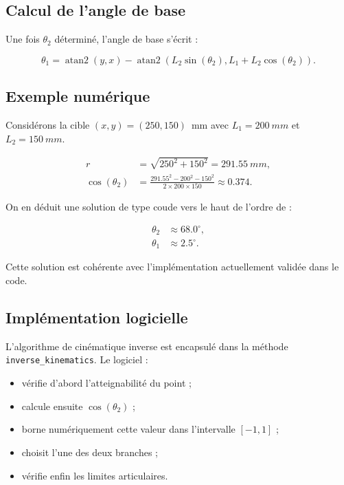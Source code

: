 \documentclass[12pt,a4paper]{report}
\newcommand{\Lone}{L_1}
\newcommand{\Ltwo}{L_2}
\newcommand{\thone}{\theta_1}
\newcommand{\thtwo}{\theta_2}
\begin{document}
\subsection{Calcul de l'angle de base}

Une fois $\thtwo$ déterminé, l'angle de base s'écrit :

\begin{equation}
    \thone = \operatorname{atan2}(y,x)
    - \operatorname{atan2}\left(\Ltwo \sin(\thtwo), \Lone + \Ltwo \cos(\thtwo)\right).
\end{equation}

\subsection{Exemple numérique}

Considérons la cible $(x,y) = (250,150)$~mm avec $\Lone=\SI{200}{mm}$ et
$\Ltwo=\SI{150}{mm}$.

\begin{align}
    r &= \sqrt{250^2 + 150^2} = \SI{291.55}{mm}, \\
    \cos(\thtwo) &= \frac{291.55^2 - 200^2 - 150^2}{2 \times 200 \times 150}
    \approx 0.374.
\end{align}

On en déduit une solution de type coude vers le haut de l'ordre de :

\begin{align}
    \thtwo &\approx 68.0^\circ, \\
    \thone &\approx 2.5^\circ.
\end{align}

Cette solution est cohérente avec l'implémentation actuellement validée dans le code.

\subsection{Implémentation logicielle}

L'algorithme de cinématique inverse est encapsulé dans la méthode
\texttt{inverse\_kinematics}. Le logiciel :

\begin{itemize}
    \item vérifie d'abord l'atteignabilité du point ;
    \item calcule ensuite $\cos(\thtwo)$ ;
    \item borne numériquement cette valeur dans l'intervalle $[-1,1]$ ;
    \item choisit l'une des deux branches ;
    \item vérifie enfin les limites articulaires.
\end{itemize}
\end{document}
